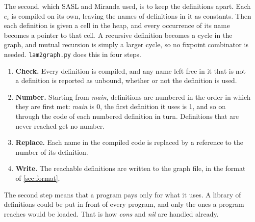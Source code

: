 \documentclass[11pt,a4paper]{article}
\theoremstyle{definition}
\theoremstyle{plain}
\begin{document}
The second, which SASL and Miranda used, is to keep the definitions apart.
Each $e_i$ is compiled on its own, leaving the names of definitions in it as
constants. Then each definition is given a cell in the heap, and every
occurrence of its name becomes a pointer to that cell. A recursive definition
becomes a cycle in the graph, and mutual recursion is simply a larger cycle,
so no fixpoint combinator is needed. \texttt{lam2graph.py} does this in four
steps.

\begin{enumerate}[itemsep=2pt]
\item \textbf{Check.} Every definition is compiled, and any name left free in
  it that is not a definition is reported as unbound, whether or not the
  definition is used.
\item \textbf{Number.} Starting from \textit{main}, definitions are numbered
  in the order in which they are first met: \textit{main} is 0, the first
  definition it uses is 1, and so on through the code of each numbered
  definition in turn. Definitions that are never reached get no number.
\item \textbf{Replace.} Each name in the compiled code is replaced by a
  reference to the number of its definition.
\item \textbf{Write.} The reachable definitions are written to the graph
  file, in the format of \cref{sec:format}.
\end{enumerate}

\noindent
The second step means that a program pays only for what it uses. A library
of definitions could be put in front of every program, and only the ones a
program reaches would be loaded. That is how \textit{cons} and \textit{nil}
are handled already.
\end{document}
